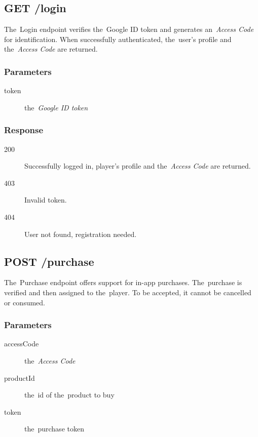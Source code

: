 \subsection{GET /login}

The~Login endpoint verifies the~Google ID token and generates an~\textit{Access Code} for identification. When successfully authenticated, the~user's profile and the~\textit{Access Code} are returned.

\subsubsection*{Parameters}

\begin{description}

	\item[token] the~\textit{Google ID token}

\end{description}

\subsubsection*{Response}

\begin{description}

	\item[200] Successfully logged in, player's profile and the~\textit{Access Code} are returned.

	\item[403] Invalid token.

	\item[404] User not found, registration needed.

\end{description}

\subsection{POST /purchase}

The~Purchase endpoint offers support for in-app purchases. The~purchase is verified and then assigned to the~player. To be accepted, it cannot be cancelled or consumed.

\subsubsection*{Parameters}

\begin{description}

	\item[accessCode] the~\textit{Access Code}

	\item[productId] the~id of the~product to buy

	\item[token] the~purchase token

\end{description}


